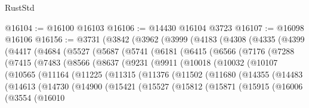 \begin{lexlean}{RustStd}
\begin{coremodule}
@16104 := @16100 @16103
@16106 := @14430 @16104 @3723
@16107 := @16098 @16106
@16156 := @3731
    (@3842
      (@3962
        (@3999
          (@4183
            (@4308
              (@4335
                (@4399
                  (@4417
                    (@4684
                      (@5527
                        (@5687
                          (@5741
                            (@6181
                              (@6415
                                (@6566
                                  (@7176
                                    (@7288
                                      (@7415
                                        (@7483
                                          (@8566
                                            (@8637
                                              (@9231
                                                (@9911
                                                  (@10018
                                                    (@10032
                                                      (@10107
                                                        (@10565
                                                          (@11164
                                                            (@11225
                                                              (@11315
                                                                (@11376
                                                                  (@11502
                                                                    (@11680
                                                                      (@14355
                                                                        (@14483
                                                                          (@14613
                                                                            (@14730
                                                                              (@14900
                                                                                (@15421
                                                                                  (@15527
                                                                                    (@15812
                                                                                      (@15871
                                                                                        (@15915
                                                                                          (@16006
                                                                                            (@3554
                                                                                              (@16010

\end{coremodule}
\end{lexlean}

